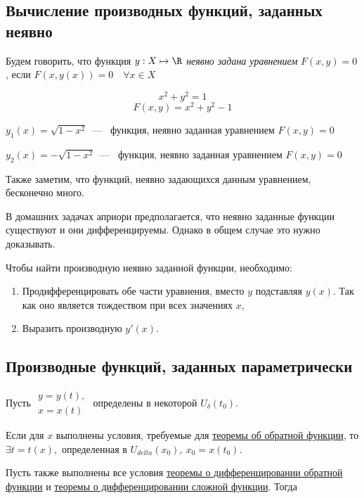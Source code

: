 \subsection{Вычисление производных функций, заданных неявно}

\begin{definition}
	Будем говорить, что функция $y: X \mapsto \R$ \textit{неявно задана уравнением} $F(x, y) = 0$, если $F(x,y(x)) = 0 \quad \forall x \in X$  
\end{definition}
\begin{example}
	$$x^2 + y^2 = 1$$
	$$F (x, y) = x^2 + y^2 - 1 $$
	
	$y_{1}(x) = \sqrt{1-x^2}$~---~ функция, неявно заданная уравнением $F (x, y) = 0$
	
	$y_{2}(x) = -\sqrt{1-x^2}$~---~ функция, неявно заданная уравнением $F (x, y) = 0  $
	
	Также заметим, что функций, неявно задающихся данным уравнением, бесконечно много.
\end{example}

\begin{note}
	В домашних задачах априори предполагается, что неявно заданные функции существуют и они дифференцируемы. Однако в общем случае это нужно доказывать.
\end{note}

Чтобы найти производную неявно заданной функции, необходимо:
\begin{enumerate}
	\item Продифференцировать обе части уравнения, вместо $y$ подставляя $y(x)$. Так как оно является тождеством при всех значениях $x$,
	\item Выразить производную $y'(x)$.
\end{enumerate}

\subsection{Производные функций, заданных параметрически}
Пусть $\begin{gathered}
	y = y(t), \\
	x = x(t)
\end{gathered}$ определены в некоторой $U_{\delta}(t_{0})$. 

Если для $x$ выполнены условия, требуемые для \hyperlink{thrm4.19}{теоремы об обратной функции}, то $\exists t = t(x),$ определенная в $U_{delta}(x_{0}),\ x_{0} = x(t_{0})$.

Пусть также выполнены все условия \hyperlink{5.11}{ теоремы о дифференцировании обратной функции} и \hyperlink{thrm5.10}{теоремы о дифференцировании сложной функции}. Тогда

